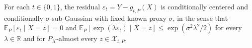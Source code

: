 For each \(t\in\{0,1\}\), the residual \(\varepsilon_t=Y-g_{t,P}(X)\) is conditionally centered and conditionally \(\sigma\)-sub-Gaussian with fixed known proxy \(\sigma\), in the sense that \(\mathbb E_P[\varepsilon_t\mid X=z]=0\) and \(\mathbb E_P[\exp(\lambda\varepsilon_t)\mid X=z]\le\exp(\sigma^2\lambda^2/2)\) for every \(\lambda\in\mathbb R\) and for \(P_X\)-almost every \(z\in\mathcal X_{t,P}\).